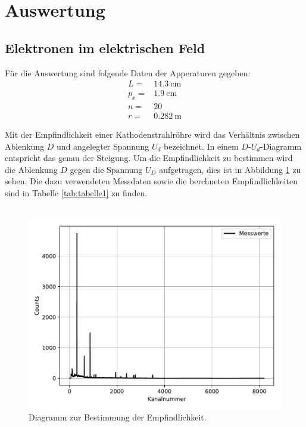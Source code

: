 \section{Auswertung}
\subsection{Elektronen im elektrischen Feld}

\label{sec:Auswertung}
Für die Auswertung sind folgende Daten der Apperaturen gegeben:
\begin{align*}
  L=&\SI{14,3}{\cm} \\
  p_{x}=&\SI{1,9}{\cm}\\
  n=&20    \\
  r=&\SI{0,282}{\m}
\end{align*}

Mit der Empfindlichkeit einer Kathodenstrahlröhre wird das Verhältnis zwischen Ablenkung $D$
und angelegter Spannung $U_d$ bezeichnet. In einem $D\text{-}U_d$-Diagramm entspricht das genau der
Steigung. Um die Empfindlichkeit zu bestimmen wird die Ablenkung $D$ gegen die
Spannung $U_D$ aufgetragen, dies ist in Abbildung \ref{fig:plot1} zu sehen.
Die dazu verwendeten Messdaten sowie die berchneten Empfindlichkeiten
sind in Tabelle \ref{tab:tabelle1} zu finden.\\
\\

\begin{figure}
  \centering
  \includegraphics{plot1.pdf}
  \caption{Diagramm zur Bestimmung der Empfindlichkeit.}
  \label{fig:plot1}
\end{figure}


